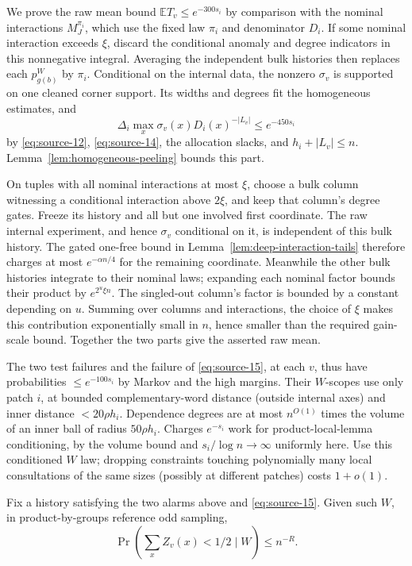 We prove the raw mean bound \(\mathbb ET_v\le e^{-300s_i}\) by comparison with the nominal interactions \(M_J^{\pi_i}\), which use the fixed law \(\pi_i\) and denominator \(D_i\).
If some nominal interaction exceeds \(\xi\), discard the conditional anomaly and degree indicators in this nonnegative integral. Averaging the independent bulk histories then replaces each \(p_{g(b)}^W\) by \(\pi_i\). Conditional on the internal data, the nonzero \(\sigma_v\) is supported on one cleaned corner support. Its widths and degrees fit the homogeneous estimates, and
\[
 \Delta_i\max_x\sigma_v(x)D_i(x)^{-|L_v|}\le e^{-450s_i}
\]
by \eqref{eq:source-12}, \eqref{eq:source-14}, the allocation slacks, and \(h_i+|L_v|\le n\). Lemma~\ref{lem:homogeneous-peeling} bounds this part.

On tuples with all nominal interactions at most \(\xi\), choose a bulk column witnessing a conditional interaction above \(2\xi\), and keep that column's degree gates. Freeze its history and all but one involved first coordinate. The raw internal experiment, and hence \(\sigma_v\) conditional on it, is independent of this bulk history. The gated one-free bound in Lemma~\ref{lem:deep-interaction-tails} therefore charges at most \(e^{-\alpha n/4}\) for the remaining coordinate. Meanwhile the other bulk histories integrate to their nominal laws; expanding each nominal factor bounds their product by \(e^{2^u\xi n}\). The singled-out column's factor is bounded by a constant depending on \(u\). Summing over columns and interactions, the choice of \(\xi\) makes this contribution exponentially small in \(n\), hence smaller than the required gain-scale bound. Together the two parts give the asserted raw mean.

The two test failures and the failure of \eqref{eq:source-15}, at each \(v\), thus have probabilities \(\le e^{-100s_i}\) by Markov and the high margins. Their \(W\)-scopes use only patch \(i\), at bounded complementary-word distance (outside internal axes) and inner distance \(<20\rho h_i\). Dependence degrees are at most \(n^{O(1)}\) times the volume of an inner ball of radius \(50\rho h_i\). Charges \(e^{-s_i}\) work for product-local-lemma conditioning, by the volume bound and \(s_i/\log n\to\infty\) uniformly here. Use this conditioned \(W\) law; dropping constraints touching polynomially many local consultations of the same sizes (possibly at different patches) costs \(1+o(1)\).

\begin{lemma}\label{lem:high-cluster-mass}
Fix a history satisfying the two alarms above and \eqref{eq:source-15}. Given such \(W\), in product-by-groups reference odd sampling,
\begin{equation}
 \Pr(\textstyle\sum_x Z_v(x)<1/2\mid W)\le n^{-R}.                    \label{eq:source-19}
\end{equation}
\end{lemma}

